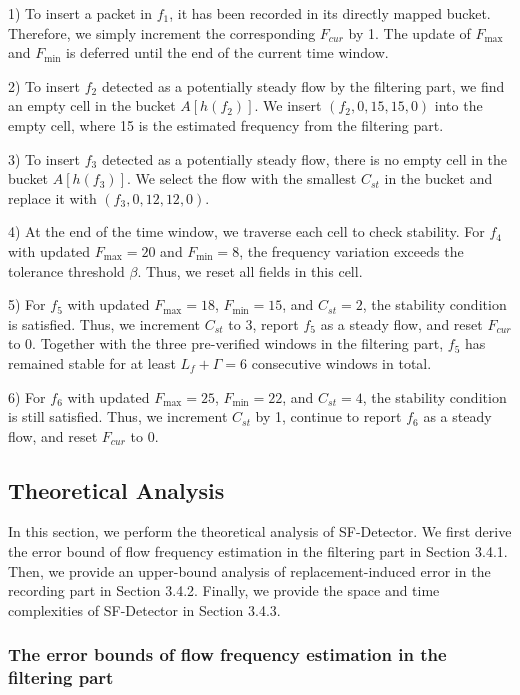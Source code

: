 \documentclass[preprint,12pt]{elsarticle}
\begin{document}
1) To insert a packet in $f_1$, it has been recorded in its directly mapped bucket. Therefore, we simply increment the corresponding $F_{cur}$ by 1. The update of $F_{\max}$ and $F_{\min}$ is deferred until the end of the current time window.

2) To insert $f_2$ detected as a potentially steady flow by the filtering part, we find an empty cell in the bucket $A[h(f_2)]$. We insert $(f_2, 0, 15, 15, 0)$ into the empty cell, where 15 is the estimated frequency from the filtering part.

3) To insert $f_3$ detected as a potentially steady flow, there is no empty cell in the bucket $A[h(f_3)]$. We select the flow with the smallest $C_{st}$ in the bucket and replace it with $(f_3, 0, 12, 12, 0)$.

4) At the end of the time window, we traverse each cell to check stability. For $f_4$ with updated $F_{\max} = 20$ and $F_{\min} = 8$, the frequency variation exceeds the tolerance threshold $\beta$. Thus, we reset all fields in this cell.

5) For $f_5$ with updated $F_{\max} = 18$, $F_{\min} = 15$, and $C_{st} = 2$, the stability condition is satisfied. Thus, we increment $C_{st}$ to 3, report $f_5$ as a steady flow, and reset $F_{cur}$ to 0. Together with the three pre-verified windows in the filtering part, $f_5$ has remained stable for at least $L_f + \Gamma = 6$ consecutive windows in total.

6) For $f_6$ with updated $F_{\max} = 25$, $F_{\min} = 22$, and $C_{st} = 4$, the stability condition is still satisfied. Thus, we increment $C_{st}$ by 1, continue to report $f_6$ as a steady flow, and reset $F_{cur}$ to 0.

\subsection{Theoretical Analysis}
In this section, we perform the theoretical analysis of SF-Detector. We first derive the error bound of flow frequency estimation in the filtering part in Section 3.4.1. Then, we provide an upper-bound analysis of replacement-induced error in the recording part in Section 3.4.2. Finally, we provide the space and time complexities of SF-Detector in Section 3.4.3.

\subsubsection{The error bounds of flow frequency estimation in the filtering part}
\end{document}
